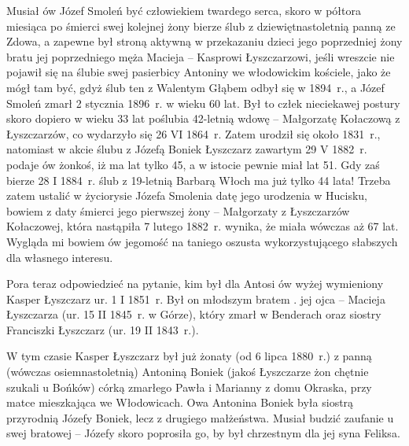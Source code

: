 Musiał ów Józef Smoleń być człowiekiem twardego serca, skoro w półtora miesiąca po śmierci swej kolejnej żony bierze ślub z dziewiętnastoletnią panną ze Zdowa, a zapewne był stroną aktywną w przekazaniu dzieci jego poprzedniej żony bratu jej poprzedniego męża Macieja -- Kasprowi Łyszczarzowi, jeśli wreszcie nie pojawił się na ślubie swej pasierbicy Antoniny we włodowickim kościele, jako że mógł tam być, gdyż ślub ten z Walentym Głąbem odbył się w 1894~r., a Józef Smoleń zmarł 2 stycznia 1896~r. w wieku 60 lat. Był to człek nieciekawej postury skoro dopiero w wieku 33 lat poślubia 42-letnią wdowę -- Małgorzatę Kołaczową z Łyszczarzów, co wydarzyło się 26 VI 1864~r. Zatem urodził się około 1831~r., natomiast w akcie ślubu z Józefą Boniek Łyszczarz zawartym 29 V 1882~r. podaje ów żonkoś, iż ma lat tylko 45, a w istocie pewnie miał lat 51. Gdy zaś bierze 28 I 1884~r. ślub z 19-letnią Barbarą Włoch ma już tylko 44 lata! Trzeba zatem ustalić w życiorysie Józefa Smolenia datę jego urodzenia w Hucisku, bowiem z daty śmierci jego pierwszej żony -- Małgorzaty z Łyszczarzów Kołaczowej, która nastąpiła 7 lutego 1882~r. wynika, że miała wówczas aż 67 lat. Wygląda mi bowiem ów jegomość na taniego oszusta wykorzystującego słabszych dla własnego interesu.

Pora teraz odpowiedzieć na pytanie, kim był dla Antosi ów wyżej wymieniony Kasper Łyszczarz ur. 1 I 1851~r. Był on młodszym bratem . jej ojca -- Macieja Łyszczarza (ur. 15 II 1845~r. w Górze), który zmarł w Benderach oraz siostry Franciszki Łyszczarz (ur. 19 II 1843~r.).

W tym czasie Kasper Łyszczarz był już żonaty (od 6 lipca 1880~r.) z panną (wówczas osiemnastoletnią) Antoniną Boniek (jakoś Łyszczarze żon chętnie szukali u Bońków) córką zmarłego Pawła i Marianny z domu Okraska, przy matce mieszkająca we Włodowicach. Owa Antonina Boniek była siostrą przyrodnią Józefy Boniek, lecz z drugiego małżeństwa. Musiał budzić zaufanie u swej bratowej -- Józefy skoro poprosiła go, by był chrzestnym dla jej syna Feliksa.


